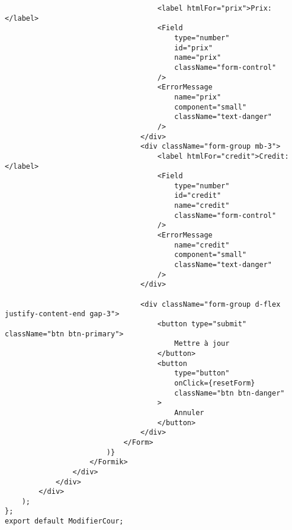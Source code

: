 \documentclass[10pt,a4paper]{article}
\begin{document}
\begin{verbatim}
                                    <label htmlFor="prix">Prix:</label>
                                    <Field
                                        type="number"
                                        id="prix"
                                        name="prix"
                                        className="form-control"
                                    />
                                    <ErrorMessage
                                        name="prix"
                                        component="small"
                                        className="text-danger"
                                    />
                                </div>
                                <div className="form-group mb-3">
                                    <label htmlFor="credit">Credit:</label>
                                    <Field
                                        type="number"
                                        id="credit"
                                        name="credit"
                                        className="form-control"
                                    />
                                    <ErrorMessage
                                        name="credit"
                                        component="small"
                                        className="text-danger"
                                    />
                                </div>

                                <div className="form-group d-flex justify-content-end gap-3">
                                    <button type="submit" className="btn btn-primary">
                                        Mettre à jour
                                    </button>
                                    <button
                                        type="button"
                                        onClick={resetForm}
                                        className="btn btn-danger"
                                    >
                                        Annuler
                                    </button>
                                </div>
                            </Form>
                        )}
                    </Formik>
                </div>
            </div>
        </div>
    );
};
export default ModifierCour;
\end{verbatim}
\end{document}

